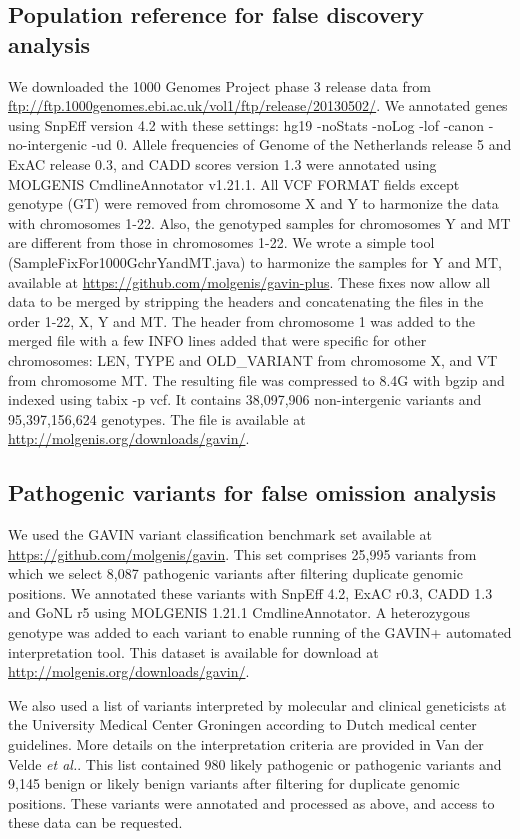 \subsection{Population reference for false discovery analysis}
We downloaded the 1000 Genomes Project phase 3\cite{Auton_2015} release data from \url{ftp://ftp.1000genomes.ebi.ac.uk/vol1/ftp/release/20130502/}.
We annotated genes using SnpEff version 4.2 with these settings: hg19 -noStats -noLog -lof -canon -no-intergenic -ud 0.
Allele frequencies of Genome of the Netherlands\cite{Francioli_2014} release 5 and ExAC\cite{Lek_2016} release 0.3, and CADD scores\cite{Kircher_2014} version 1.3 were annotated using MOLGENIS CmdlineAnnotator v1.21.1.
All VCF FORMAT fields except genotype (GT) were removed from chromosome X and Y to harmonize the data with chromosomes 1-22.
Also, the genotyped samples for chromosomes Y and MT are different from those in chromosomes 1-22.
We wrote a simple tool (SampleFixFor1000GchrYandMT.java) to harmonize the samples for Y and MT, available at \url{https://github.com/molgenis/gavin-plus}.
These fixes now allow all data to be merged by stripping the headers and concatenating the files in the order 1-22, X, Y and MT.
The header from chromosome 1 was added to the merged file with a few INFO lines added that were specific for other chromosomes: LEN, TYPE and OLD\_\-VARIANT from chromosome X, and VT from chromosome MT.
The resulting file was compressed to 8.4G with bgzip and indexed using tabix -p vcf.
It contains 38,097,906 non-intergenic variants and 95,397,156,624 genotypes.
The file is available at \url{http://molgenis.org/downloads/gavin/}.

\subsection{Pathogenic variants for false omission analysis}
We used the GAVIN\cite{van_der_Velde_2017} variant classification benchmark set available at \url{https://github.com/molgenis/gavin}.
This set comprises 25,995 variants from which we select 8,087 pathogenic variants after filtering duplicate genomic positions.
We annotated these variants with SnpEff 4.2, ExAC r0.3, CADD 1.3 and GoNL r5 using MOLGENIS 1.21.1 CmdlineAnnotator.
A heterozygous genotype was added to each variant to enable running of the GAVIN+ automated interpretation tool.
This dataset is available for download at \url{http://molgenis.org/downloads/gavin/}.

We also used a list of variants interpreted by molecular and clinical geneticists at the University Medical Center Groningen according to Dutch medical center guidelines\cite{ACGN}.
More details on the interpretation criteria are provided in Van der Velde \textsl{et al.}\cite{van_der_Velde_2017}.
This list contained 980 likely pathogenic or pathogenic variants and 9,145 benign or likely benign variants after filtering for duplicate genomic positions.
These variants were annotated and processed as above, and access to these data can be requested.

